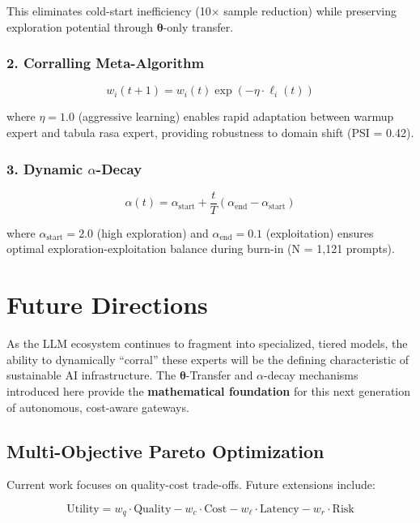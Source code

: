 \documentclass[sigconf]{acmart}
\begin{document}
This eliminates cold-start inefficiency (10$\times$ sample reduction) while preserving exploration potential through $\boldsymbol{\theta}$-only transfer.

\subsubsection{2. Corralling Meta-Algorithm}

\begin{equation}
w_i(t+1) = w_i(t) \exp\left( -\eta \cdot \ell_i(t) \right)
\end{equation}

where $\eta = 1.0$ (aggressive learning) enables rapid adaptation between warmup expert and tabula rasa expert, providing robustness to domain shift (PSI = 0.42).

\subsubsection{3. Dynamic $\alpha$-Decay}

\begin{equation}
\alpha(t) = \alpha_{\text{start}} + \frac{t}{T} (\alpha_{\text{end}} - \alpha_{\text{start}})
\end{equation}

where $\alpha_{\text{start}} = 2.0$ (high exploration) and $\alpha_{\text{end}} = 0.1$ (exploitation) ensures optimal exploration-exploitation balance during burn-in (N = 1,121 prompts).

\section{Future Directions}

As the LLM ecosystem continues to fragment into specialized, tiered models, the ability to dynamically ``corral'' these experts will be the defining characteristic of sustainable AI infrastructure. The $\boldsymbol{\theta}$-Transfer and $\alpha$-decay mechanisms introduced here provide the \textbf{mathematical foundation} for this next generation of autonomous, cost-aware gateways.

\subsection{Multi-Objective Pareto Optimization}

Current work focuses on quality-cost trade-offs. Future extensions include:

\begin{equation}
\text{Utility} = w_q \cdot \text{Quality} - w_c \cdot \text{Cost} - w_\ell \cdot \text{Latency} - w_r \cdot \text{Risk}
\end{equation}
\end{document}
